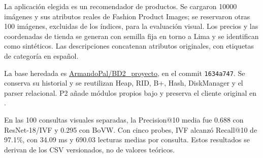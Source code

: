 \documentclass[11pt,a4paper]{article}
\newcommand{\code}[1]{\texttt{#1}}
\begin{document}
La aplicación elegida es un recomendador de productos. Se cargaron 10000 imágenes y sus atributos reales de Fashion Product Images; se reservaron otras 100 imágenes, excluidas de los índices, para la evaluación visual. Los precios y las coordenadas de tienda se generan con semilla fija en torno a Lima y se identifican como sintéticos. Las descripciones concatenan atributos originales, con etiquetas de categoría en español.

La base heredada es \href{https://github.com/ArmandoPal/BD2_proyecto}{ArmandoPal/BD2\_proyecto}, en el commit \code{1634a747}. Se conserva su historial y se reutilizan Heap, RID, B+, Hash, DiskManager y el parser relacional. P2 añade módulos propios bajo  y preserva el cliente original en .

En las 100 consultas visuales separadas, la Precision@10 media fue 0.688 con ResNet-18/IVF y 0.295 con BoVW. Con cinco probes, IVF alcanzó Recall@10 de 97.1\%, con 34.09 ms y 690.03 lecturas medias por consulta. Estos resultados se derivan de los CSV versionados, no de valores teóricos.
\end{document}
